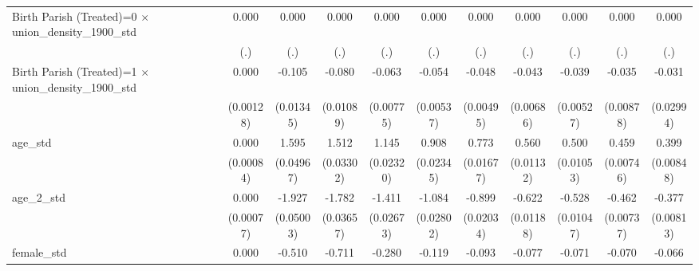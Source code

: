 {\begin{tabular}{l*{10}{c}}
Birth Parish (Treated)=0 $\times$ union\_density\_1900\_std&       0.000         &       0.000         &       0.000         &       0.000         &       0.000         &       0.000         &       0.000         &       0.000         &       0.000         &       0.000         \\
                    &         (.)         &         (.)         &         (.)         &         (.)         &         (.)         &         (.)         &         (.)         &         (.)         &         (.)         &         (.)         \\
Birth Parish (Treated)=1 $\times$ union\_density\_1900\_std&       0.000         &      -0.105\sym{***}&      -0.080\sym{***}&      -0.063\sym{***}&      -0.054\sym{***}&      -0.048\sym{***}&      -0.043\sym{***}&      -0.039\sym{***}&      -0.035\sym{***}&      -0.031         \\
                    &   (0.00128)         &   (0.01345)         &   (0.01089)         &   (0.00775)         &   (0.00537)         &   (0.00495)         &   (0.00686)         &   (0.00527)         &   (0.00878)         &   (0.02994)         \\
age\_std             &       0.000         &       1.595\sym{***}&       1.512\sym{***}&       1.145\sym{***}&       0.908\sym{***}&       0.773\sym{***}&       0.560\sym{***}&       0.500\sym{***}&       0.459\sym{***}&       0.399\sym{***}\\
                    &   (0.00084)         &   (0.04967)         &   (0.03302)         &   (0.02320)         &   (0.02345)         &   (0.01677)         &   (0.01132)         &   (0.01053)         &   (0.00746)         &   (0.00848)         \\
age\_2\_std           &       0.000         &      -1.927\sym{***}&      -1.782\sym{***}&      -1.411\sym{***}&      -1.084\sym{***}&      -0.899\sym{***}&      -0.622\sym{***}&      -0.528\sym{***}&      -0.462\sym{***}&      -0.377\sym{***}\\
                    &   (0.00077)         &   (0.05003)         &   (0.03657)         &   (0.02673)         &   (0.02802)         &   (0.02034)         &   (0.01188)         &   (0.01047)         &   (0.00737)         &   (0.00813)         \\
female\_std          &       0.000         &      -0.510\sym{***}&      -0.711\sym{***}&      -0.280\sym{***}&      -0.119\sym{***}&      -0.093\sym{***}&      -0.077\sym{***}&      -0.071\sym{***}&      -0.070\sym{***}&      -0.066\sym{***}\\

\end{tabular}}
